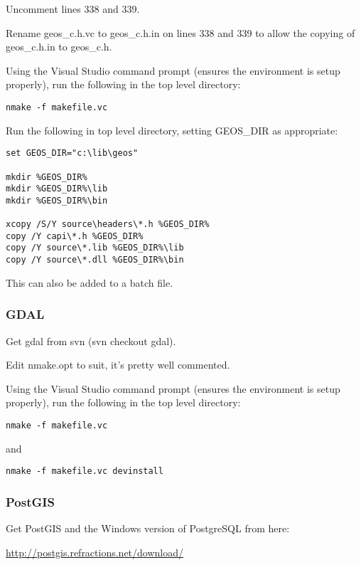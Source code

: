 Uncomment lines 338 and 339.

Rename geos\_c.h.vc to geos\_c.h.in on lines 338 and 339 to allow the copying of geos\_c.h.in to geos\_c.h.

Using the Visual Studio command prompt (ensures the environment is setup properly), run the following in the top level directory:

\begin{verbatim}
nmake -f makefile.vc 
\end{verbatim}

Run the following in top level directory, setting GEOS\_DIR as appropriate:

\begin{verbatim}
set GEOS_DIR="c:\lib\geos"

mkdir %GEOS_DIR%
mkdir %GEOS_DIR%\lib
mkdir %GEOS_DIR%\bin

xcopy /S/Y source\headers\*.h %GEOS_DIR%
copy /Y capi\*.h %GEOS_DIR%
copy /Y source\*.lib %GEOS_DIR%\lib
copy /Y source\*.dll %GEOS_DIR%\bin
\end{verbatim}

This can also be added to a batch file.

\subsubsection{GDAL}
Get gdal from svn (svn checkout  gdal).

Edit nmake.opt to suit, it's pretty well commented.

Using the Visual Studio command prompt (ensures the environment is setup properly), run the following in the top level directory:

\begin{verbatim}
nmake -f makefile.vc 
\end{verbatim}

and

\begin{verbatim}
nmake -f makefile.vc devinstall 
\end{verbatim}

\subsubsection{PostGIS}
Get PostGIS and the Windows version of PostgreSQL from here:

\url{http://postgis.refractions.net/download/}

